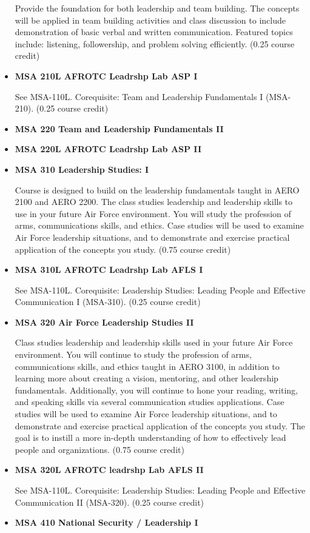 \documentclass[
  letterpaper,
]{scrbook}
\begin{document}
\begin{itemize}
  Provide the foundation for both leadership and team building. The
  concepts will be applied in team building activities and class
  discussion to include demonstration of basic verbal and written
  communication. Featured topics include: listening, followership, and
  problem solving efficiently. (0.25 course credit)
\item
  \textbf{MSA 210L AFROTC Leadrshp Lab ASP I}

  See MSA-110L. Corequisite: Team and Leadership Fundamentals I
  (MSA-210). (0.25 course credit)
\item
  \textbf{MSA 220 Team and Leadership Fundamentals II}
\item
  \textbf{MSA 220L AFROTC Leadrshp Lab ASP II}
\item
  \textbf{MSA 310 Leadership Studies: I}

  Course is designed to build on the leadership fundamentals taught in
  AERO 2100 and AERO 2200. The class studies leadership and leadership
  skills to use in your future Air Force environment. You will study the
  profession of arms, communications skills, and ethics. Case studies
  will be used to examine Air Force leadership situations, and to
  demonstrate and exercise practical application of the concepts you
  study. (0.75 course credit)
\item
  \textbf{MSA 310L AFROTC Leadrshp Lab AFLS I}

  See MSA-110L. Corequisite: Leadership Studies: Leading People and
  Effective Communication I (MSA-310). (0.25 course credit)
\item
  \textbf{MSA 320 Air Force Leadership Studies II}

  Class studies leadership and leadership skills used in your future Air
  Force environment. You will continue to study the profession of arms,
  communications skills, and ethics taught in AERO 3100, in addition to
  learning more about creating a vision, mentoring, and other leadership
  fundamentals. Additionally, you will continue to hone your reading,
  writing, and speaking skills via several communication studies
  applications. Case studies will be used to examine Air Force
  leadership situations, and to demonstrate and exercise practical
  application of the concepts you study. The goal is to instill a more
  in-depth understanding of how to effectively lead people and
  organizations. (0.75 course credit)
\item
  \textbf{MSA 320L AFROTC leadrshp Lab AFLS II}

  See MSA-110L. Corequisite: Leadership Studies: Leading People and
  Effective Communication II (MSA-320). (0.25 course credit)
\item
  \textbf{MSA 410 National Security / Leadership I}


\end{itemize}
\end{document}
